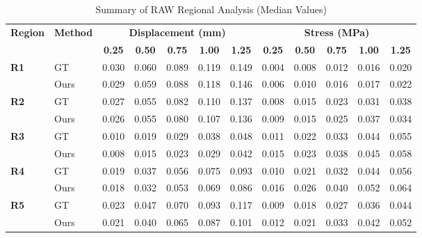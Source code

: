 \documentclass{article}
\begin{document}
\thispagestyle{empty}

\begin{table}[h]
\centering
\caption{Summary of RAW Regional Analysis (Median Values)}
\vspace{0.3cm}
\begin{tabular}{llcccccccccc}
\toprule
\multirow{2}{*}{\textbf{Region}} & \multirow{2}{*}{\textbf{Method}} & \multicolumn{5}{c}{\textbf{Displacement (mm)}} & \multicolumn{5}{c}{\textbf{Stress (MPa)}} \\
\cmidrule(lr){3-7} \cmidrule(lr){8-12}
& & \textbf{0.25} & \textbf{0.50} & \textbf{0.75} & \textbf{1.00} & \textbf{1.25} & \textbf{0.25} & \textbf{0.50} & \textbf{0.75} & \textbf{1.00} & \textbf{1.25} \\
\midrule
\multirow{2}{*}{\textbf{R1}} & GT  & 0.030 & 0.060 & 0.089 & 0.119 & 0.149 & 0.004 & 0.008 & 0.012 & 0.016 & 0.020 \\
 & Ours  & 0.029 & 0.059 & 0.088 & 0.118 & 0.146 & 0.006 & 0.010 & 0.016 & 0.017 & 0.022 \\ \midrule
\multirow{2}{*}{\textbf{R2}} & GT  & 0.027 & 0.055 & 0.082 & 0.110 & 0.137 & 0.008 & 0.015 & 0.023 & 0.031 & 0.038 \\
 & Ours  & 0.026 & 0.055 & 0.080 & 0.107 & 0.136 & 0.009 & 0.015 & 0.025 & 0.037 & 0.034 \\ \midrule
\multirow{2}{*}{\textbf{R3}} & GT  & 0.010 & 0.019 & 0.029 & 0.038 & 0.048 & 0.011 & 0.022 & 0.033 & 0.044 & 0.055 \\
 & Ours  & 0.008 & 0.015 & 0.023 & 0.029 & 0.042 & 0.015 & 0.023 & 0.038 & 0.045 & 0.058 \\ \midrule
\multirow{2}{*}{\textbf{R4}} & GT  & 0.019 & 0.037 & 0.056 & 0.075 & 0.093 & 0.010 & 0.021 & 0.032 & 0.044 & 0.056 \\
 & Ours  & 0.018 & 0.032 & 0.053 & 0.069 & 0.086 & 0.016 & 0.026 & 0.040 & 0.052 & 0.064 \\ \midrule
\multirow{2}{*}{\textbf{R5}} & GT  & 0.023 & 0.047 & 0.070 & 0.093 & 0.117 & 0.009 & 0.018 & 0.027 & 0.036 & 0.044 \\
 & Ours  & 0.021 & 0.040 & 0.065 & 0.087 & 0.101 & 0.012 & 0.021 & 0.033 & 0.042 & 0.052 \\
\bottomrule
\end{tabular}
\end{table}
\end{document}
